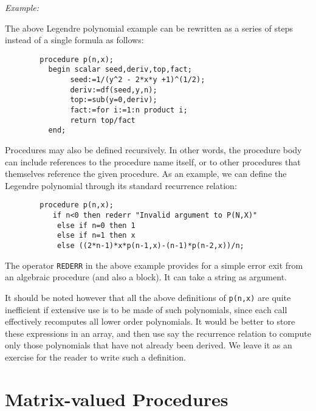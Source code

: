 \textit{Example:}

The above Legendre polynomial example can be rewritten as a series of steps
instead of a single formula as follows:
\begin{verbatim}
        procedure p(n,x);
          begin scalar seed,deriv,top,fact;
               seed:=1/(y^2 - 2*x*y +1)^(1/2);
               deriv:=df(seed,y,n);
               top:=sub(y=0,deriv);
               fact:=for i:=1:n product i;
               return top/fact
          end;
\end{verbatim}
Procedures may also be defined recursively.  In other words, the procedure
body can include references to the procedure name
itself, or to other procedures that themselves reference the given
procedure.  As an example, we can define the Legendre polynomial through
its standard recurrence relation:
\begin{verbatim}
        procedure p(n,x);
           if n<0 then rederr "Invalid argument to P(N,X)"
            else if n=0 then 1
            else if n=1 then x
            else ((2*n-1)*x*p(n-1,x)-(n-1)*p(n-2,x))/n;
\end{verbatim}

\hypertarget{operator:REDERR}{}
The operator \texttt{REDERR} in the above example provides
for a simple error exit from an algebraic procedure (and also a block).
It can take a string as argument.

It should be noted however that all the above definitions of \texttt{p(n,x)} are
quite inefficient if extensive use is to be made of such polynomials, since
each call effectively recomputes all lower order polynomials. It would be
better to store these expressions in an array, and then use say the
recurrence relation to compute only those polynomials that have not already
been derived. We leave it as an exercise for the reader to write such a
definition.

\section{Matrix-valued Procedures}
\hypertarget{command:MATRIXPROC}{}


